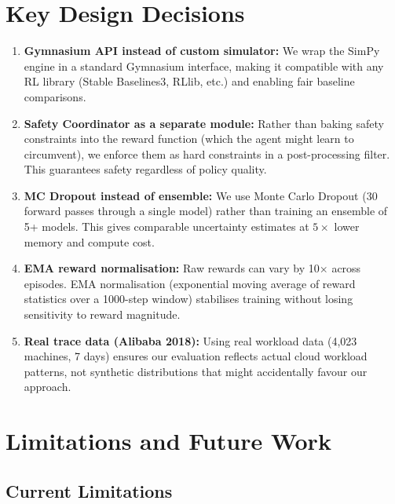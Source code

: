 \documentclass[11pt,a4paper]{article}
\begin{document}
\section{Key Design Decisions}\label{sec:design-decisions}


\begin{enumerate}[leftmargin=2em]
  \item \textbf{Gymnasium API instead of custom simulator:} We wrap the SimPy
        engine in a standard Gymnasium interface, making it compatible with any
        RL library (Stable Baselines3, RLlib, etc.) and enabling fair baseline
        comparisons.

  \item \textbf{Safety Coordinator as a separate module:} Rather than baking
        safety constraints into the reward function (which the agent might
        learn to circumvent), we enforce them as hard constraints in a
        post-processing filter. This guarantees safety regardless of policy
        quality.

  \item \textbf{MC Dropout instead of ensemble:} We use Monte Carlo Dropout
        (30 forward passes through a single model) rather than training an
        ensemble of 5+ models. This gives comparable uncertainty estimates at
        $5\times$ lower memory and compute cost.

  \item \textbf{EMA reward normalisation:} Raw rewards can vary by 10$\times$
        across episodes. EMA normalisation (exponential moving average of
        reward statistics over a 1000-step window) stabilises training without
        losing sensitivity to reward magnitude.

  \item \textbf{Real trace data (Alibaba 2018):} Using real workload data
        (4,023 machines, 7 days) ensures our evaluation reflects actual
        cloud workload patterns, not synthetic distributions that might
        accidentally favour our approach.
\end{enumerate}


\section{Limitations and Future Work}\label{sec:limitations}


\subsection{Current Limitations}
\end{document}
